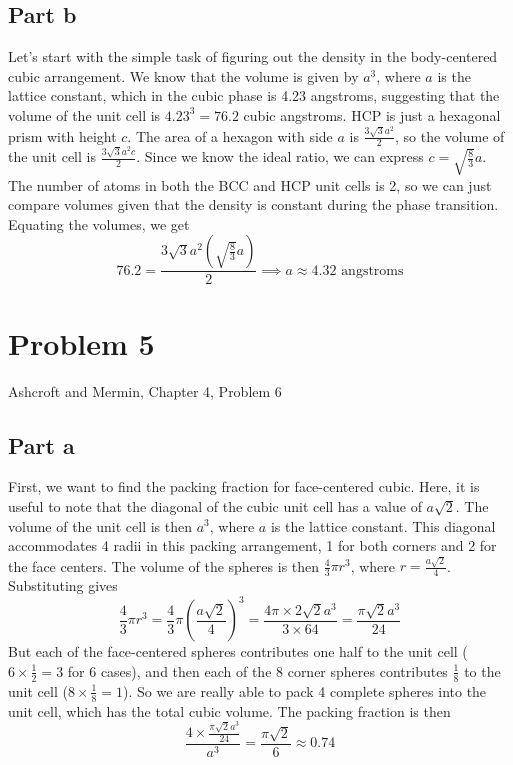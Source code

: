 \documentclass[12pt]{article}
\begin{document}
\subsection{Part b}
Let's start with the simple task of figuring out the density in the body-centered cubic arrangement. We know that the volume is given by $a^3$, where $a$ is the lattice constant, which in the cubic phase is 4.23 angstroms, suggesting that the volume of the unit cell is $4.23^3 = 76.2$ cubic angstroms. HCP is just a hexagonal prism with height $c$. The area of a hexagon with side $a$ is $\frac{3\sqrt{3}a^2}{2}$, so the volume of the unit cell is $\frac{3\sqrt{3}a^2c}{2}$. Since we know the ideal ratio, we can express $c=\sqrt{\frac{8}{3}}a$. The number of atoms in both the BCC and HCP unit cells is 2, so we can just compare volumes given that the density is constant during the phase transition. Equating the volumes, we get
\begin{equation}
    76.2 = \frac{3\sqrt{3}a^2\left(\sqrt{\frac{8}{3}}a\right)}{2} \implies a \approx 4.32 \text{ angstroms}
\end{equation}
\section{Problem 5}
Ashcroft and Mermin, Chapter 4, Problem 6
\subsection{Part a}
First, we want to find the packing fraction for face-centered cubic. Here, it is useful to note that the diagonal of the cubic unit cell has a value of \(a\sqrt{2}\). The volume of the unit cell is then \(a^3\), where \(a\) is the lattice constant. This diagonal accommodates 4 radii in this packing arrangement, 1 for both corners and 2 for the face centers. The volume of the spheres is then \(\frac{4}{3}\pi r^3\), where \(r = \frac{a\sqrt{2}}{4}\). Substituting gives
\begin{equation}
    \frac{4}{3}\pi r^3 = \frac{4}{3}\pi \left(\frac{a\sqrt{2}}{4}\right)^3 = \frac{4\pi \times 2\sqrt{2}a^3}{3 \times 64} = \frac{\pi\sqrt{2}a^3}{24}
\end{equation}
But each of the face-centered spheres contributes one half to the unit cell ($6 \times \frac{1}{2} = 3$ for 6 cases), and then each of the 8 corner spheres contributes \(\frac{1}{8}\) to the unit cell ($8 \times \frac{1}{8} = 1$). So we are really able to pack 4 complete spheres into the unit cell, which has the total cubic volume. The packing fraction is then
\begin{equation}
    \frac{4 \times \frac{\pi\sqrt{2}a^3}{24}}{a^3} = \frac{\pi\sqrt{2}}{6} \approx 0.74
\end{equation}
\end{document}
